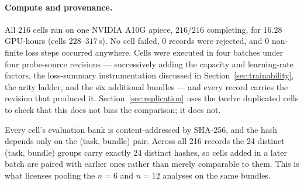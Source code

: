\documentclass[10pt,twocolumn]{article}
\begin{document}
\paragraph{Compute and provenance.}
All 216 cells ran on one NVIDIA A10G apiece, $216/216$ completing, for $16.28$
GPU-hours (cells $228$--$317$\,s). No cell failed, $0$ records were rejected,
and $0$ non-finite loss steps occurred anywhere. Cells were executed in four
batches under four probe-source revisions --- successively adding the capacity
and learning-rate factors, the loss-summary instrumentation discussed in
Section~\ref{sec:trainability}, the arity ladder, and the six additional
bundles --- and every record carries the revision that produced it.
Section~\ref{sec:replication} uses the twelve duplicated cells to
check that this does not bias the comparison; it does not.

Every cell's evaluation bank is content-addressed by SHA-256, and the hash
depends only on the (task, bundle) pair. Across all 216 records the 24 distinct
(task, bundle) groups carry exactly 24 distinct hashes, so cells added in a later
batch are paired with earlier ones rather than merely comparable to them. This is
what licenses pooling the $n=6$ and $n=12$ analyses on the same bundles.
\end{document}
